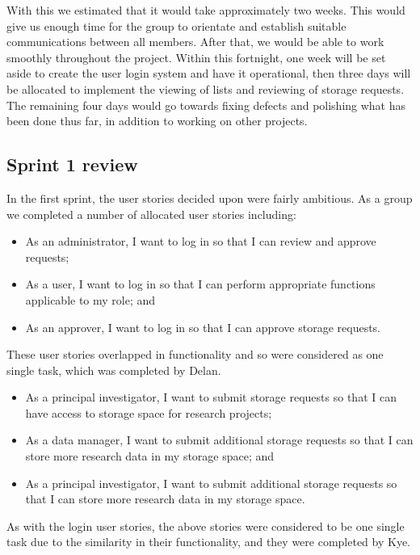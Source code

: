 \documentclass[a4paper,titlepage,12pt]{article}
\begin{document}
With this we estimated that it would take approximately two weeks. This would
give us enough time for the group to orientate and establish suitable
communications between all members. After that, we would be able to work
smoothly throughout the project. Within this fortnight, one week will be set
aside to create the user login system and have it operational, then three days
will be allocated to implement the viewing of lists and reviewing of storage
requests. The remaining four days would go towards fixing defects and polishing
what has been done thus far, in addition to working on other projects.

\subsection{Sprint 1 review}

In the first sprint, the user stories decided upon were fairly ambitious. As a
group we completed a number of allocated user stories including:

\begin{itemize}
	\item As an administrator, I want to log in so that I can review and
	      approve requests;
	\item As a user, I want to log in so that I can perform appropriate
	      functions applicable to my role; and
	\item As an approver, I want to log in so that I can approve storage
	      requests.
\end{itemize}

These user stories overlapped in functionality and so were considered as one
single task, which was completed by Delan.

\begin{itemize}
	\item As a principal investigator, I want to submit storage requests so
	      that I can have access to storage space for research projects;
	\item As a data manager, I want to submit additional storage requests
	      so that I can store more research data in my storage space; and
	\item As a principal investigator, I want to submit additional storage
	      requests so that I can store more research data in my storage
	      space.
\end{itemize}

As with the login user stories, the above stories were considered to be one
single task due to the similarity in their functionality, and they were
completed by Kye.
\end{document}
